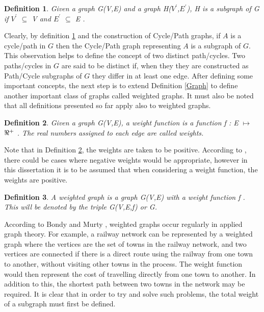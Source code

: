 \documentclass[12pt]{article}
\newtheorem{definition}{Definition}[subsection]
\numberwithin{equation}{subsection}
\numberwithin{table}{subsection}
\numberwithin{algorithm}{subsection}
\numberwithin{figure}{subsection}
\begin{document}
\begin{definition}
\label{subgraph}
Given a graph G(V,E) and a graph H($V^\prime$,$E^\prime$), H is a subgraph of G if $V^\prime$ $\subseteq$ V and $E^\prime$ $\subseteq$ E .
\end{definition}
Clearly, by definition \ref{subgraph} and the construction of Cycle/Path graphs, if $A$ is a cycle/path in $G$ then the Cycle/Path graph representing $A$ is a subgraph of $G$. This observation helps to define the concept of two distinct path/cycles. Two paths/cycles in $G$ are said to be distinct if, when they they are constructed as Path/Cycle subgraphs of $G$ they differ in at least one edge. After defining some important concepts, the next step is to extend Definition \ref{Graph} to define another important class of graphs called weighted graphs. It must also be noted that all definitions presented so far apply also to weighted graphs.
\begin{definition}
\label{Weighted Function}
Given a graph G(V,E), a weight function is a function f : E $\mapsto$ $\real^+$ {}. The real numbers assigned to each edge are called weights.
\end{definition}
Note that in Definition \ref{Weighted Function}, the weights are taken to be positive. According to \cite{harris_hirst_mossinghoff_2008}, there could be cases where negative weights would be appropriate, however in this dissertation it is to be assumed that when considering a weight function, the weights are positive.
\begin{definition}
\label{Weighted Graph}
A weighted graph is a graph G(V,E) with a weight function f {}. This will be denoted by the triple G(V,E,f) or G. 
\end{definition}
According to Bondy and Murty \cite{bondy_murty_1982}, weighted graphs occur regularly in applied graph theory. For example, a railway network can be represented by a weighted graph where the vertices are the set of towns in the railway network, and two vertices are connected if there is a direct route using the railway from one town to another, without visiting other towns in the process. The weight function would then represent the cost of travelling directly from one town to another. In addition to this, the shortest path between two towns in the network may be required. It is clear that in order to try and solve such problems, the total weight of a subgraph must first be defined.
\end{document}
